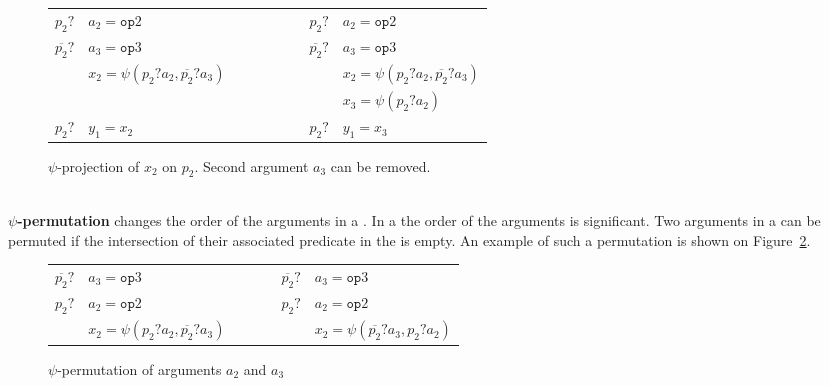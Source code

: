 \begin{figure}[h]
\footnotesize
\hfill
\begin{tabular}{llp{3cm}ll}
${p_2?}$ & ${a_2 = \texttt{op}2}$             & \ \ \ \ \ \ \ \  & ${p_2?}$ & ${a_2 = \texttt{op}2}$ \\
${\overline{p_2}?}$ & ${a_3 = \texttt{op}3}$              & \ \ \ \  & ${\overline{p_2}?}$ & ${a_3 = \texttt{op}3}$ \\
             & ${x_2 = \psi(p_2?a_2, \overline{p_2}?a_3)}$ & \ \ \ \  &              &${x_2 = \psi(p_2?a_2, \overline{p_2}?a_3)}$ \\
             &                               & \ \ \ \  &              & ${x_3 = \psi(p_2?a_2)}$ \\
${p_2?}$ & ${y_1 = x_2}$              & \ \ \ \  & ${p_2?}$ & ${y_1 = x_3}$ \\
\end{tabular}
\caption{$\psi$-projection of $x_2$ on $p_2$. Second argument $a_3$ can be removed.}
\label{fig:psi_projection}
\end{figure}

~\\
\textbf{$\psi$-permutation} changes the order of the
  arguments in a \psifun. In a \psifun the order of
  the arguments is significant. Two arguments in a \psifun can
  be permuted if the intersection of their associated predicate in the
  \psifun is empty. An example of such a permutation is shown
  on Figure~\ref{fig:psi_permutation}.

\begin{figure}[h]
\footnotesize
\hfill
\begin{tabular}{llp{3cm}ll}
${\overline{p_2}?}$ & ${a_3 = \texttt{op}3}$              & \ \ \ \  & ${\overline{p_2}?}$ & ${a_3 = \texttt{op}3}$ \\
${p_2?}$ & ${a_2 = \texttt{op}2}$             & \ \ \ \  & ${p_2?}$ & ${a_2 = \texttt{op}2}$ \\
             & ${x_2 = \psi(p_2?a_2, \overline{p_2}?a_3)}$ & \ \ \ \  &              &${x_2 = \psi(\overline{p_2}?a_3, p_2?a_2)}$ \\
\end{tabular}
\caption{$\psi$-permutation of arguments $a_2$ and $a_3$}
\label{fig:psi_permutation}
\end{figure}

